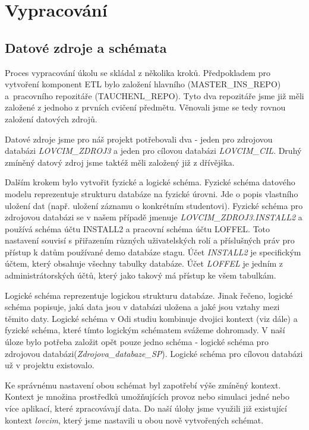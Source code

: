 \section{Vypracování}

 \subsection{Datové zdroje a schémata}
 \par Proces vypracování úkolu se skládal z několika kroků. Předpokladem pro 
 vytvoření komponent ETL bylo založení hlavního (MASTER\_INS\_REPO) a~pracovního repozitáře (TAUCHENL\_REPO). Tyto dva repozitáře jsme již měli založené z jednoho z prvních cvičení předmětu.  Věnovali jsme se tedy rovnou založení datových zdrojů. 
 
 \par  Datové zdroje jsme pro náš projekt potřebovali dva - jeden pro zdrojovou databázi \textit{LOVCIM\_ZDROJ3} a jeden pro cílovou databázi \textit{LOVCIM\_CIL}. Druhý zmíněný datový zdroj jsme taktéž měli založený již z dřívějška. 
 
  \par Dalším krokem bylo vytvořit fyzické a logické schéma. Fyzické schéma datového modelu reprezentuje strukturu databáze na fyzické úrovni. Jde o popis vlastního uložení dat (např. uložení záznamu o konkrétním studentovi). Fyzické schéma pro zdrojovou databázi se v našem případě jmenuje \textit{LOVCIM\_ZDROJ3.INSTALL2} a používá schéma účtu INSTALL2 a pracovní schéma účtu LOFFEL. Toto nastavení souvisí s přiřazením různých uživatelských rolí a příslušných práv pro přístup k datům používané demo databáze stagu. Účet \textit{INSTALL2} je specifickým účtem, který obsahuje všechny tabulky databáze. Účet \textit{LOFFEL} je jedním z administrátorských účtů, který jako takový má přístup ke všem tabulkám. 
 
  \par Logické schéma reprezentuje logickou strukturu databáze. Jinak řečeno, logické schéma popisuje, jaká data jsou v databázi uložena a jaké jsou vztahy mezi těmito daty. Logické schéma v Odi studiu kombinuje dvojici kontext (viz dále) a fyzické schéma, které tímto logickým schématem svážeme dohromady. V naší úloze bylo potřeba založit opět pouze jedno schéma - logické schéma pro zdrojovou databázi(\textit{Zdrojova\_databaze\_SP}). Logické schéma pro cílovou databázi už v projektu existovalo. 
 
  \par Ke správnému nastavení obou schémat byl zapotřebí výše zmíněný kontext. Kontext je množina prostředků umožňujících provoz nebo simulaci jedné nebo více aplikací, které zpracovávají data. Do naší úlohy jsme využili již existující kontext \textit{lovcim}, který jsme nastavili u obou nově vytvořených schémat. 
 
